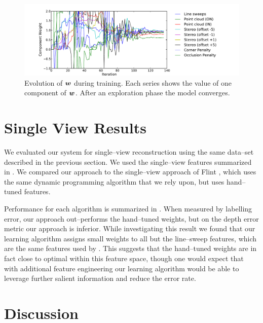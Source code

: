 \begin{figure}[tb]
  \centering
  \includegraphics[width=\textwidth]{figures/psi_evolution}
  \caption{Evolution of $\boldsymbol{w}$ during training. Each series shows
    the value of one component of $\boldsymbol{w}$. After an
    exploration phase the model converges.}
  \label{fig:psi-evolution}
\end{figure}

\section{Single View Results}
\label{sec:sv-results}

We evaluated our system for single--view reconstruction using the same
data--set described in the previous section. We used the single--view
features summarized in . We compared our approach
to the single--view approach of Flint \etal \cite{Flint10eccv}, which
uses the same dynamic programming algorithm that we rely upon, but
uses hand--tuned features.

Performance for each algorithm is summarized in
. When measured by labelling error, our
approach out--performs the hand--tuned weights, but on the depth error
metric our approach is inferior. While investigating this result we
found that our learning algorithm assigns small weights to all but the
line--sweep features, which are the same features used by
\cite{Flint10eccv}. This suggests that the hand--tuned weights are in
fact close to optimal within this feature space, though one would
expect that with additional feature engineering our learning algorithm
would be able to leverage further salient information and reduce the
error rate.



\section{Discussion}
\label{sec:discussion}

